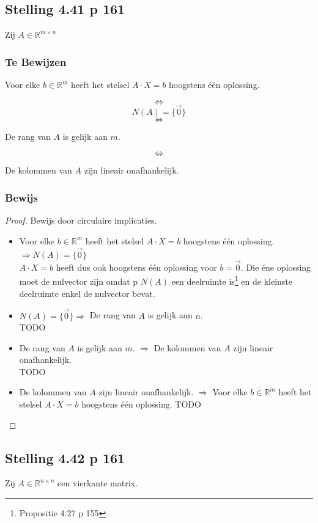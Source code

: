 \documentclass[lineaire_algebra_oplossingen.tex]{subfiles}
\begin{document}
\subsection{Stelling 4.41 p 161}
Zij $A \in \mathbb{R}^{m\times n}$
\subsubsection*{Te Bewijzen}
\begin{center}
Voor elke $b \in \mathbb{R}^m$ heeft het stelsel $A\cdot X = b$ hoogstens \'e\'en oplossing.
\end{center}
\[\Leftrightarrow\]
\[N(A) = \{\vec{0}\}\]
\[\Leftrightarrow\]
\begin{center}
De rang van $A$ is gelijk aan $m$.
\end{center}
\[\Leftrightarrow\]
\begin{center}
De kolommen van $A$ zijn lineair onafhankelijk.
\end{center}
\subsubsection*{Bewijs}
\begin{proof}
Bewijs door circulaire implicaties.
\begin{itemize}
\item
Voor elke $b \in \mathbb{R}^m$ heeft het stelsel $A\cdot X = b$ hoogstens \'e\'en oplossing.
 $\Rightarrow N(A) = \{\vec{0}\}$\\
$A\cdot X = b$ heeft dus ook hoogstens \'e\'en oplossing voor $b = \vec{0}$. Die \'ene oplossing moet de nulvector zijn omdat  p $N(A)$ een deelruimte is\footnote{Propositie 4.27 p 155} en de kleinste deelruimte enkel de nulvector bevat.
\item
$N(A) = \{\vec{0}\} \Rightarrow $ De rang van $A$ is gelijk aan $n$.\\
TODO
\item
De rang van $A$ is gelijk aan $m$. $\Rightarrow$ De kolommen van $A$ zijn lineair onafhankelijk.\\
TODO
\item
De kolommen van $A$ zijn lineair onafhankelijk. $\Rightarrow$ Voor elke $b \in \mathbb{R}^m$ heeft het stelsel $A\cdot X = b$ hoogstens \'e\'en oplossing.
TODO
\end{itemize}
\end{proof}

\subsection{Stelling 4.42 p 161}
Zij $A\in \mathbb{R}^{n \times n}$ een vierkante matrix.
\end{document}

